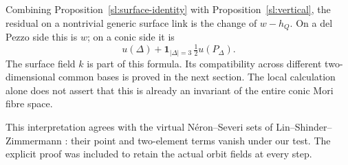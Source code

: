\begin{remark}\label{sl:local-correction}
Combining Proposition~\ref{sl:surface-identity} with
Proposition~\ref{sl:vertical}, the residual on a nontrivial generic
surface link is the change of $w-h_Q$.  On a del Pezzo side this is
$w$; on a conic side it is
\[
 u(\Delta)+\mathbf1_{|\Delta|=3}\,\tfrac12u(P_\Delta).
\]
The surface field $k$ is part of this formula.  Its compatibility
across different two-dimensional common bases is proved in the next
section.  The local calculation alone does not assert that this is
already an invariant of the entire conic Mori fibre space.
\end{remark}

This interpretation agrees with the virtual N\'eron--Severi sets
of Lin--Shinder--Zimmermann
\cite[Proposition~4.8, Definition~5.2 and Proposition~5.5]{LinShinderZimmermann23}:
their point and two-element terms vanish under our test.  The explicit
proof was included to retain the actual orbit fields at every step.
